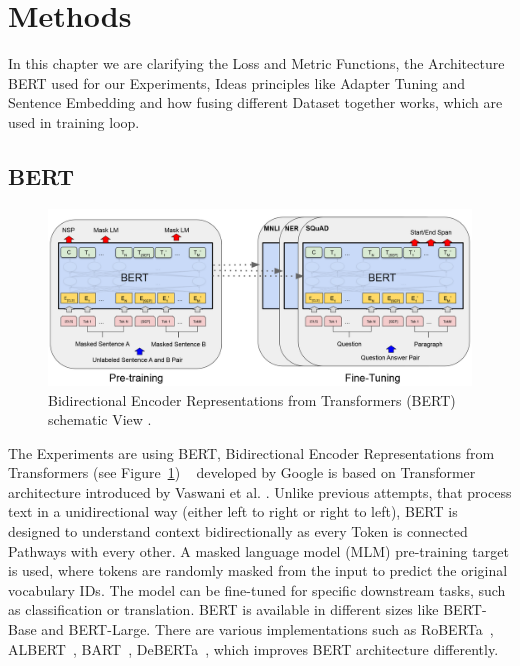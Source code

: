 \section{Methods}\label{sec:methods}
In this chapter we are clarifying the Loss and Metric Functions, the Architecture BERT used for our Experiments, Ideas principles like Adapter Tuning and
Sentence Embedding and how fusing different Dataset together works, which are used in training loop.


\subsection{BERT}
\begin{figure}[b]
    \centering
    \includegraphics[scale=0.22]{./content/BERT_Architecture.png}
    \caption{Bidirectional Encoder Representations from Transformers (BERT) 
             schematic View \cite{devlin_bert_2019}.}
    \label{tab:bert}
\end{figure}

The Experiments are using BERT, Bidirectional Encoder Representations from Transformers (see Figure~\ref{tab:bert}) ~\cite{devlin_bert_2019} 
developed by Google is based on Transformer architecture introduced by Vaswani et al. \cite{vaswani_attention_2023}.
Unlike previous attempts, that process text in a unidirectional way (either left to right or right to 
left), BERT is designed to understand context bidirectionally as every Token is connected Pathways with every other. A masked language model (MLM) 
pre-training target is used, where tokens are randomly masked from the input to predict the original 
vocabulary IDs.
The model can be fine-tuned for specific downstream tasks, such as classification or translation. 
BERT is available in different sizes like BERT-Base and BERT-Large. There are various implementations 
such as RoBERTa~\cite{liu_roberta_2019}, ALBERT~\cite{lan_albert_2020}, BART~\cite{lewis_bart_2020}, 
DeBERTa~\cite{he_deberta_2021}, which improves BERT architecture differently.


